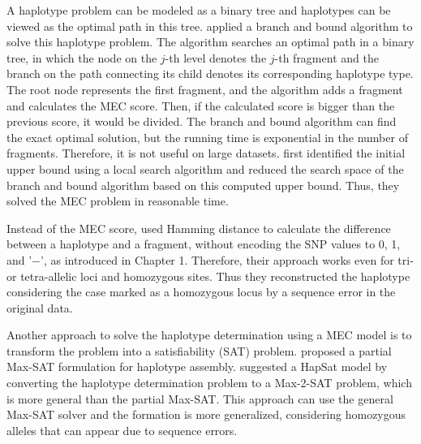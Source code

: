 A haplotype problem can be modeled as a binary tree and haplotypes can be viewed as the optimal path in this tree. 
\cite{wang2005haplotype} applied a branch
and bound algorithm to solve this haplotype problem. 
The algorithm searches an optimal path in a binary tree, in which
the node on the $j$-th level denotes the $j$-th fragment and the
branch on the path connecting its child denotes its
corresponding haplotype type. 
The root node represents the first fragment, and the
algorithm adds a fragment and calculates the MEC score. 
Then, if the calculated score is bigger than the previous score, it would be divided. 
The branch and bound algorithm
can find the exact optimal solution, but the running time is exponential in the number of
fragments. Therefore, it is not useful on large datasets. 
\cite{lim2012individual} first identified the initial upper bound using a local search algorithm and 
reduced the search space of the branch and bound algorithm based on this computed upper bound.
Thus, they solved the MEC problem in reasonable time.

Instead of the MEC score, \cite{wang2012using} used Hamming distance to calculate the difference between a haplotype and a fragment, 
without encoding the SNP values to 0, 1, and '−', as introduced in Chapter 1. 
Therefore, their  approach works even for tri- or tetra-allelic loci and homozygous sites. 
Thus they reconstructed the haplotype considering the case marked as a homozygous locus by a sequence error in the original data. 

Another approach to solve the haplotype determination using a MEC model is to transform the problem into a satisfiability (SAT) problem. 
\cite{he2010optimal} proposed a partial Max-SAT formulation for haplotype assembly. 
\cite{mousavi2011effective} suggested a HapSat model by converting the haplotype determination problem to a Max-2-SAT problem,
which is more general than the partial Max-SAT. 
This approach can use the general Max-SAT solver and the formation is more generalized, 
considering homozygous alleles that can appear due to sequence errors.


